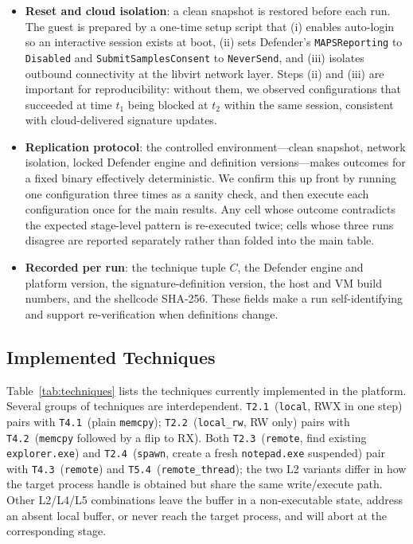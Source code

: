 \begin{itemize}[leftmargin=*, itemsep=1pt]
    \item \textbf{Reset and cloud isolation}: a clean snapshot is restored before each run. The guest is prepared by a one-time setup script that (i) enables auto-login so an interactive session exists at boot, (ii) sets Defender's \texttt{MAPSReporting} to \texttt{Disabled} and \texttt{SubmitSamplesConsent} to \texttt{NeverSend}, and (iii) isolates outbound connectivity at the libvirt network layer. Steps (ii) and (iii) are important for reproducibility: without them, we observed configurations that succeeded at time $t_1$ being blocked at $t_2$ within the same session, consistent with cloud-delivered signature updates.
    \item \textbf{Replication protocol}: the controlled environment---clean snapshot, network isolation, locked Defender engine and definition versions---makes outcomes for a fixed binary effectively deterministic. We confirm this up front by running one configuration three times as a sanity check, and then execute each configuration once for the main results. Any cell whose outcome contradicts the expected stage-level pattern is re-executed twice; cells whose three runs disagree are reported separately rather than folded into the main table.
    \item \textbf{Recorded per run}: the technique tuple $C$, the Defender engine and platform version, the signature-definition version, the host and VM build numbers, and the shellcode SHA-256. These fields make a run self-identifying and support re-verification when definitions change.
\end{itemize}

\subsection{Implemented Techniques}

Table~\ref{tab:techniques} lists the techniques currently implemented in the platform.
Several groups of techniques are interdependent.
\texttt{T2.1}~(\texttt{local}, RWX in one step) pairs with \texttt{T4.1}~(plain \texttt{memcpy}); \texttt{T2.2}~(\texttt{local\_rw}, RW only) pairs with \texttt{T4.2}~(\texttt{memcpy} followed by a flip to RX).
Both \texttt{T2.3}~(\texttt{remote}, find existing \texttt{explorer.exe}) and \texttt{T2.4}~(\texttt{spawn}, create a fresh \texttt{notepad.exe} suspended) pair with \texttt{T4.3}~(\texttt{remote}) and \texttt{T5.4}~(\texttt{remote\_thread}); the two L2 variants differ in how the target process handle is obtained but share the same write/execute path.
Other L2/L4/L5 combinations leave the buffer in a non-executable state, address an absent local buffer, or never reach the target process, and will abort at the corresponding stage.

